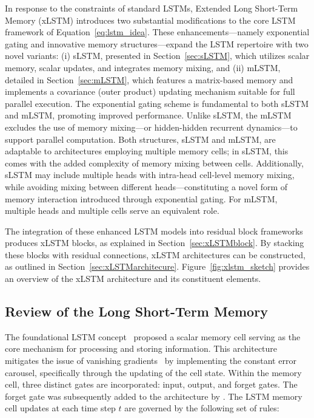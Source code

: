 In response to the constraints of standard LSTMs, Extended Long Short-Term Memory (xLSTM) introduces two substantial modifications to the core LSTM framework of Equation~\eqref{eq:lstm_idea}. These enhancements—namely exponential gating and innovative memory structures—expand the LSTM repertoire with two novel variants: (i) sLSTM, presented in Section~\ref{sec:sLSTM}, which utilizes scalar memory, scalar updates, and integrates memory mixing, and (ii) mLSTM, detailed in Section~\ref{sec:mLSTM}, which features a matrix-based memory and implements a covariance (outer product) updating mechanism suitable for full parallel execution. The exponential gating scheme is fundamental to both sLSTM and mLSTM, promoting improved performance. Unlike sLSTM, the mLSTM excludes the use of memory mixing—or hidden-hidden recurrent dynamics—to support parallel computation. Both structures, sLSTM and mLSTM, are adaptable to architectures employing multiple memory cells; in sLSTM, this comes with the added complexity of memory mixing between cells. Additionally, sLSTM may include multiple heads with intra-head cell-level memory mixing, while avoiding mixing between different heads—constituting a novel form of memory interaction introduced through exponential gating. For mLSTM, multiple heads and multiple cells serve an equivalent role.

The integration of these enhanced LSTM models into residual block frameworks produces xLSTM blocks, as explained in Section~\ref{sec:xLSTMblock}. By stacking these blocks with residual connections, xLSTM architectures can be constructed, as outlined in Section~\ref{sec:xLSTMarchitecure}. Figure~\ref{fig:xlstm_sketch} provides an overview of the xLSTM architecture and its constituent elements.

\subsection{Review of the Long Short-Term Memory}
\label{sec:orgLSTM}

The foundational LSTM concept~\citep{Hochreiter:91,Hochreiter:97nips,Hochreiter:97} proposed a scalar memory cell serving as the core mechanism for processing and storing information. This architecture mitigates the issue of vanishing gradients~\citep{Hochreiter:91,Hochreiter:00book} by implementing the constant error carousel, specifically through the updating of the cell state. Within the memory cell, three distinct gates are incorporated: input, output, and forget gates. The forget gate was subsequently added to the architecture by \citet{Gers:00}. The LSTM memory cell updates at each time step $t$ are governed by the following set of rules:

